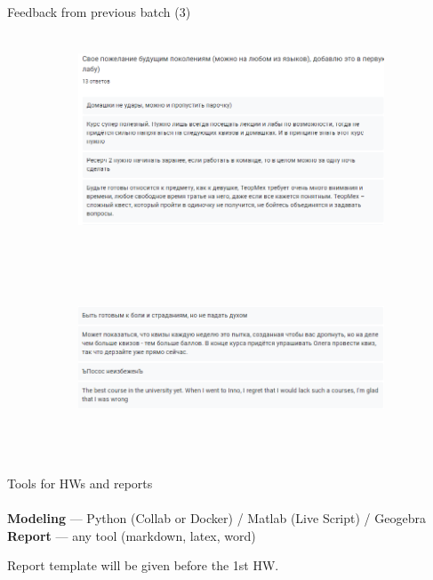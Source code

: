 \documentclass[aspectratio=169,xcolor=table,10pt, notes=hide]{beamer}
\begin{document}
\begin{frame}[t]{Feedback from previous batch (3)
    }
    \framesubtitle{}
    \begin{figure}[H]
        \begin{subfigure}{0.49\textwidth}
            \centering\includegraphics[height=6cm,width=1\textwidth,keepaspectratio]{image23.png}
        \end{subfigure}
        \begin{subfigure}{0.49\textwidth}
            \centering\includegraphics[height=6cm,width=1\textwidth,keepaspectratio]{image21.png}
        \end{subfigure}
    \end{figure}
\end{frame}

\begin{frame}[t]{Tools for HWs and reports}
    \framesubtitle{}
    \textbf{Modeling} --- Python (Collab or Docker) / Matlab (Live Script) / Geogebra\\
    \textbf{Report} --- any tool (markdown, latex, word)

    \begin{center}
        \Large Report template will be given before the 1st HW.
    \end{center}
\end{frame}
\end{document}

